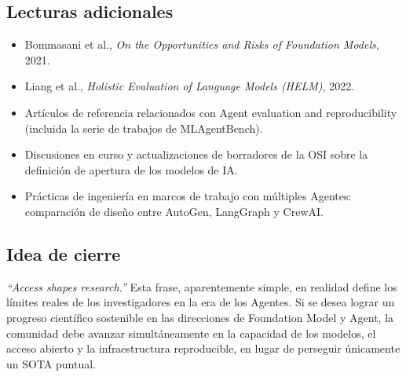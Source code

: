 \subsection{Lecturas adicionales}
\begin{itemize}
    \item Bommasani et al., \textit{On the Opportunities and Risks of Foundation Models}, 2021.
    \item Liang et al., \textit{Holistic Evaluation of Language Models (HELM)}, 2022.
    \item Artículos de referencia relacionados con Agent evaluation and reproducibility (incluida la serie de trabajos de MLAgentBench).
    \item Discusiones en curso y actualizaciones de borradores de la OSI sobre la definición de apertura de los modelos de IA.
    \item Prácticas de ingeniería en marcos de trabajo con múltiples Agentes: comparación de diseño entre AutoGen, LangGraph y CrewAI.
\end{itemize}

\subsection{Idea de cierre}
\textit{``Access shapes research.''} Esta frase, aparentemente simple, en realidad define los límites reales de los investigadores en la era de los Agentes.  
Si se desea lograr un progreso científico sostenible en las direcciones de Foundation Model y Agent, la comunidad debe avanzar simultáneamente en la capacidad de los modelos, el acceso abierto y la infraestructura reproducible, en lugar de perseguir únicamente un SOTA puntual.



